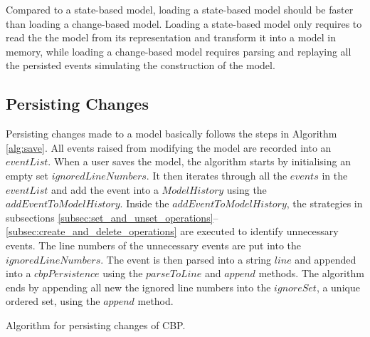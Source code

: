 \documentclass{llncs}
\begin{document}
Compared to a state-based model, loading a state-based model should be faster than loading a change-based model. Loading a state-based model only requires to read the the model from its representation and transform it into a model in memory, while loading a change-based model requires parsing and replaying all the persisted events simulating the construction of the model.

\subsection{Persisting Changes}
Persisting changes made to a model basically follows the steps in Algorithm \ref{alg:save}. All events raised from modifying the model are recorded into an $eventList$. When a user saves the model, the algorithm starts by initialising an empty set $ignoredLineNumbers$. It then iterates through all the $events$ in the $eventList$ and add the event into a $ModelHistory$ using the $addEventToModelHistory$. Inside the $addEventToModelHistory$, the strategies in subsections \ref{subsec:set_and_unset_operations}--\ref{subsec:create_and_delete_operations} are executed to identify unnecessary events. The line numbers of the unnecessary events are put into the $ignoredLineNumbers$. The event is then parsed into a string $line$ and appended into a $cbpPersistence$ using the $parseToLine$ and $append$ methods. The algorithm ends by appending all new the ignored line numbers into the $ignoreSet$, a unique ordered set, using the $append$ method.

\begin{algorithm}[H]
    \begin{small}
    \end{small}
    \caption{Algorithm for persisting changes of CBP.}
    \label{alg:save}
\end{algorithm}
\end{document}
